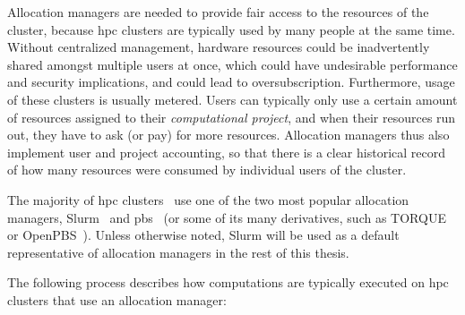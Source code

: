 Allocation managers are needed to provide fair access to the resources of the cluster, because
\gls{hpc} clusters are typically used by many people at the same time. Without
centralized management, hardware resources could be inadvertently shared amongst multiple users at
once, which could have undesirable performance and security implications, and could lead to
oversubscription. Furthermore, usage of these clusters is usually metered. Users can typically only
use a certain amount of resources assigned to their \emph{computational project}, and when their
resources run out, they have to ask (or pay) for more resources. Allocation managers thus also
implement user and project accounting, so that there is a clear historical record of how many
resources were consumed by individual users of the cluster.

The majority of \gls{hpc} clusters~\cite{slurm-schedmd} use one of the two
most popular allocation managers, Slurm~\cite{slurm} and
\gls{pbs}~\cite{pbs} (or some of its many derivatives,
such as TORQUE~\cite{torque} or OpenPBS~\cite{openpbs}). Unless otherwise noted, Slurm will be used
as a default representative of allocation managers in the rest of this thesis.

The following process describes how computations are typically executed on
\gls{hpc} clusters that use an allocation manager:

